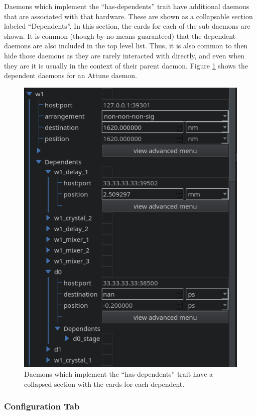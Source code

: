 Daemons which implement the ``has-dependents'' trait have additional daemons that are associated with that hardware.
These are shown as a collapsable section labeled ``Dependents''.
In this section, the cards for each of the sub daemons are shown.
It is common (though by no means guaranteed) that the dependent daemons are also included in the top level list.
Thus, it is also common to then hide those daemons as they are rarely interacted with directly, and even when they are it is usually in the context of their parent daemon.
Figure \ref{yaq:fig:dependents} shows the dependent daemons for an Attune daemon.

\begin{figure}
\includegraphics[width=4.5in]{"yaq/images/dependents"}
\caption[\yaqcqtpy{} Dependent Hardware]{
	Daemons which implement the ``has-dependents'' trait have a collapsed section with the cards for each dependent.
}
\label{yaq:fig:dependents}
\end{figure}

\subsubsection{Configuration Tab}

